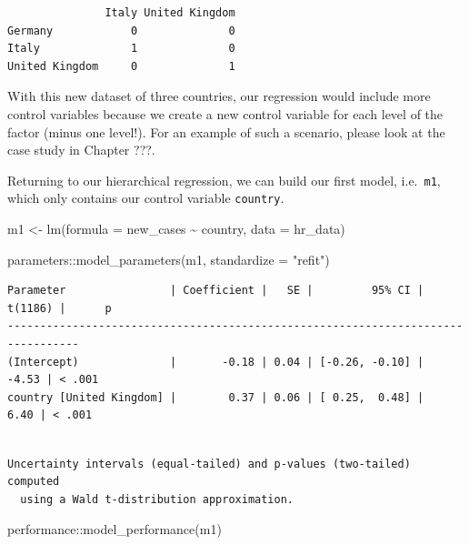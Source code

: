 \documentclass[
  letterpaper,
]{krantz}
\makeatletter
\newenvironment{Shaded}{\begin{snugshade}}{\end{snugshade}}
\newcommand{\AttributeTok}[1]{\textcolor[rgb]{0.40,0.45,0.13}{#1}}
\newcommand{\FunctionTok}[1]{\textcolor[rgb]{0.28,0.35,0.67}{#1}}
\newcommand{\NormalTok}[1]{\textcolor[rgb]{0.00,0.23,0.31}{#1}}
\newcommand{\OtherTok}[1]{\textcolor[rgb]{0.00,0.23,0.31}{#1}}
\newcommand{\SpecialCharTok}[1]{\textcolor[rgb]{0.37,0.37,0.37}{#1}}
\newcommand{\StringTok}[1]{\textcolor[rgb]{0.13,0.47,0.30}{#1}}
\newenvironment{kframe}{%
\medskip{}
\setlength{\fboxsep}{.8em}
 \def\at@end@of@kframe{}%
 \ifinner\ifhmode%
  \def\at@end@of@kframe{\end{minipage}}%
  \begin{minipage}{\columnwidth}%
 \fi\fi%
 \def\FrameCommand##1{\hskip\@totalleftmargin \hskip-\fboxsep
 \colorbox{shadecolor}{##1}\hskip-\fboxsep
     \hskip-\linewidth \hskip-\@totalleftmargin \hskip\columnwidth}%
 \MakeFramed {\advance\hsize-\width
   \@totalleftmargin\z@ \linewidth\hsize
   \@setminipage}}%
 {\par\unskip\endMakeFramed%
 \at@end@of@kframe}
\renewenvironment{Shaded}{\begin{kframe}}{\end{kframe}}
\makeatother
\begin{document}
\begin{verbatim}
               Italy United Kingdom
Germany            0              0
Italy              1              0
United Kingdom     0              1
\end{verbatim}

With this new dataset of three countries, our regression would include
more control variables because we create a new control variable for each
level of the factor (minus one level!). For an example of such a
scenario, please look at the case study in Chapter ???.

Returning to our hierarchical regression, we can build our first model,
i.e.~\texttt{m1}, which only contains our control variable
\texttt{country}.

\begin{Shaded}
\begin{Highlighting}[]
\NormalTok{m1 }\OtherTok{\textless{}{-}} \FunctionTok{lm}\NormalTok{(}\AttributeTok{formula =}\NormalTok{ new\_cases }\SpecialCharTok{\textasciitilde{}}\NormalTok{ country,}
         \AttributeTok{data =}\NormalTok{ hr\_data)}

\NormalTok{parameters}\SpecialCharTok{::}\FunctionTok{model\_parameters}\NormalTok{(m1, }\AttributeTok{standardize =} \StringTok{"refit"}\NormalTok{)}
\end{Highlighting}
\end{Shaded}

\begin{verbatim}
Parameter                | Coefficient |   SE |         95% CI | t(1186) |      p
---------------------------------------------------------------------------------
(Intercept)              |       -0.18 | 0.04 | [-0.26, -0.10] |   -4.53 | < .001
country [United Kingdom] |        0.37 | 0.06 | [ 0.25,  0.48] |    6.40 | < .001
\end{verbatim}

\begin{verbatim}

Uncertainty intervals (equal-tailed) and p-values (two-tailed) computed
  using a Wald t-distribution approximation.
\end{verbatim}

\begin{Shaded}
\begin{Highlighting}[]
\NormalTok{performance}\SpecialCharTok{::}\FunctionTok{model\_performance}\NormalTok{(m1)}
\end{Highlighting}
\end{Shaded}
\end{document}
